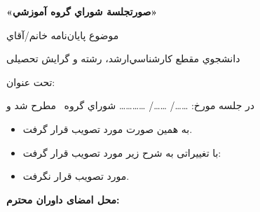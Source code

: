 \documentclass[12pt,a4paper]{article}
\begin{document}
\newpage

\begin{center}
{\lotus\Large\bfseries «صورتجلسة شوراي گروه آموزشي»}
\end{center}

\vspace{0.4cm}

\noindent موضوع پايان‌نامه خانم/‌آقاي \dotfill

\vspace{0.25cm}

\noindent دانشجوي مقطع كارشناسي‌ارشد، رشته و گرایش تحصیلی \dotfill

\vspace{0.25cm}

\noindent تحت عنوان: \dotfill

\noindent \dotfill

\vspace{0.3cm}

\noindent در جلسه مورخ: \dots\dots / \dots\dots / \dots\dots\dots\dots\hspace{0.5cm} شوراي گروه \makebox[2.5cm]{\dotfill}\ مطرح شد و

\vspace{0.3cm}

\begin{itemize}[itemsep=4pt, topsep=2pt, leftmargin=1cm]
  \item[$\square$] به همین صورت مورد تصویب قرار گرفت.
  \item[$\square$] با تغییراتی به شرح زیر مورد تصویب قرار گرفت:
\end{itemize}

\vspace{0.2cm}

\noindent\dotfill

\noindent\dotfill

\noindent\dotfill

\vspace{0.3cm}

\begin{itemize}[itemsep=4pt, topsep=2pt, leftmargin=1cm]
  \item[$\square$] مورد تصویب قرار نگرفت.
\end{itemize}

\vspace{0.4cm}

\noindent\textbf{محل امضای داوران محترم:}
\end{document}
